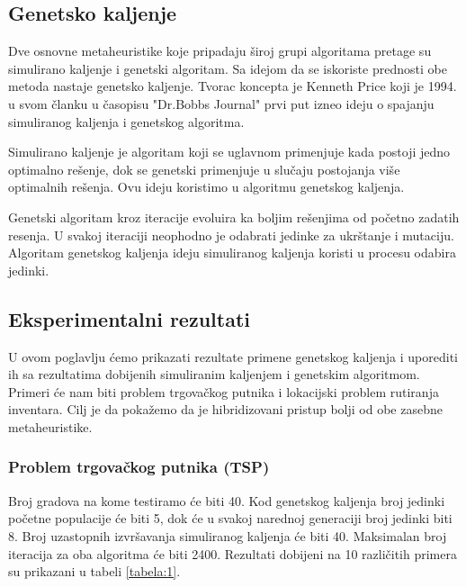 \documentclass[a4paper]{article}
\begin{document}
\subsection{Genetsko kaljenje}

Dve osnovne metaheuristike koje pripadaju široj grupi algoritama pretage su simulirano kaljenje i genetski algoritam. Sa idejom da se iskoriste prednosti obe metoda nastaje genetsko kaljenje.\cite{gk_master_rad} Tvorac koncepta je Kenneth Price koji je 1994. u svom članku u časopisu "Dr.Bobbs Journal" prvi put izneo ideju o spajanju simuliranog kaljenja i genetskog algoritma. \par
Simulirano kaljenje je algoritam koji se uglavnom primenjuje kada postoji jedno optimalno rešenje, dok se genetski primenjuje u slučaju postojanja više optimalnih rešenja. Ovu ideju koristimo u algoritmu genetskog kaljenja. \par
Genetski algoritam kroz iteracije evoluira ka boljim rešenjima od početno zadatih resenja. U svakoj iteraciji neophodno je odabrati jedinke za ukrštanje i mutaciju. Algoritam genetskog kaljenja ideju simuliranog kaljenja koristi u procesu odabira jedinki.


\subsection{Eksperimentalni rezultati}

U ovom poglavlju ćemo prikazati rezultate primene genetskog kaljenja i uporediti ih sa rezultatima dobijenih simuliranim kaljenjem i genetskim algoritmom. Primeri će nam biti problem trgovačkog putnika i lokacijski problem rutiranja inventara. Cilj je da pokažemo da je hibridizovani pristup bolji od obe zasebne metaheuristike.   \\ 


\subsubsection{Problem trgovačkog putnika (TSP) \cite{gannealingthesis}}

Broj gradova na kome testiramo će biti 40. Kod genetskog kaljenja broj jedinki početne populacije će biti 5, dok će u svakoj narednoj generaciji broj jedinki biti 8. Broj uzastopnih izvršavanja simuliranog kaljenja će biti 40. Maksimalan broj iteracija za oba algoritma će biti 2400. Rezultati dobijeni na 10 različitih primera su prikazani u tabeli \ref{tabela:1}. \\ 
\end{document}
